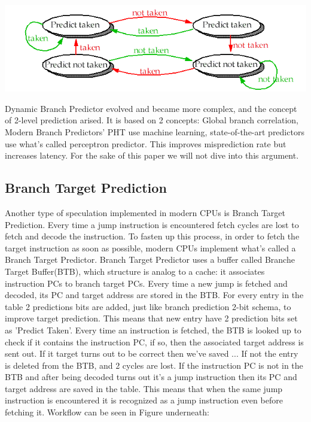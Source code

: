 \includegraphics[scale=0.35]{img/2bitBHT.png}

Dynamic Branch Predictor evolved and became more complex, and the concept of 2-level prediction arised. It is based on 2 concepts: Global branch correlation, 
Modern Branch Predictors' PHT use machine learning, state-of-the-art predictors use what's called perceptron predictor. This improves misprediction rate but increases latency. For the sake of this paper we will not dive into this argument.

\subsection{Branch Target Prediction}
Another type of speculation implemented in modern CPUs is Branch Target Prediction.
Every time a jump instruction is encountered fetch cycles are lost to fetch and decode the instruction.
To fasten up this process, in order to fetch the target instruction as soon as possible, modern CPUs implement what's called a Branch Target Predictor.
Branch Target Predictor uses a buffer called Branche Target Buffer(BTB), which structure is analog to a cache: it associates instruction PCs to branch target PCs. Every time a new jump is fetched and decoded, its PC and target address are stored in the BTB.
For every entry in the table 2 predictions bits are added, just like branch prediction 2-bit schema, to improve target prediction.
This means that new entry have 2 prediction bits set as 'Predict Taken'.
Every time an instruction is fetched, the BTB is looked up to check if it contains the instruction PC, if so, then the associated target address is sent out.
If it target turns out to be correct then we've saved ...
If not the entry is deleted from the BTB, and 2 cycles are lost.
If the instruction PC is not in the BTB and after being decoded turns out it's a jump instruction then its PC and target address are saved in the table.
This means that when the same jump instruction is encountered it is recognized as a jump instruction even before fetching it.
Workflow can be seen in Figure underneath:

